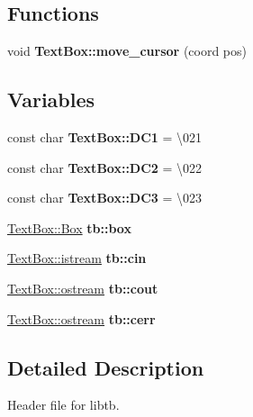 \subsection*{Functions}
\begin{DoxyCompactItemize}
\item 
\mbox{\label{a00005_a605ed7f7bc6f03b74f770ed27fa9dfa4}} 
void {\bfseries Text\+Box\+::move\+\_\+cursor} (coord pos)
\end{DoxyCompactItemize}
\subsection*{Variables}
\begin{DoxyCompactItemize}
\item 
\mbox{\label{a00005_a5f4c446b39ffcbdbf05f62a3b64795ab}} 
const char {\bfseries Text\+Box\+::\+D\+C1} = \textquotesingle{}\textbackslash{}021\textquotesingle{}
\item 
\mbox{\label{a00005_a9d3b75312942d8a8211662bdeaeab239}} 
const char {\bfseries Text\+Box\+::\+D\+C2} = \textquotesingle{}\textbackslash{}022\textquotesingle{}
\item 
\mbox{\label{a00005_ad81c1964815fe79f9d409a4fa90b8b8c}} 
const char {\bfseries Text\+Box\+::\+D\+C3} = \textquotesingle{}\textbackslash{}023\textquotesingle{}
\item 
\mbox{\label{a00005_a87aff3a50d54af71a3398935d12a5ed0}} 
\hyperlink{a00032}{Text\+Box\+::\+Box} {\bfseries tb\+::box}
\item 
\mbox{\label{a00005_ab5c1751ed3f34d419757e2b6e1d8be55}} 
\hyperlink{a00028}{Text\+Box\+::istream} {\bfseries tb\+::cin}
\item 
\mbox{\label{a00005_a5e1cc9080f68cbca6e8732e3c1d243e9}} 
\hyperlink{a00024}{Text\+Box\+::ostream} {\bfseries tb\+::cout}
\item 
\mbox{\label{a00005_aa114f595f34c913d74da26530dc71494}} 
\hyperlink{a00024}{Text\+Box\+::ostream} {\bfseries tb\+::cerr}
\end{DoxyCompactItemize}


\subsection{Detailed Description}
Header file for libtb. 


